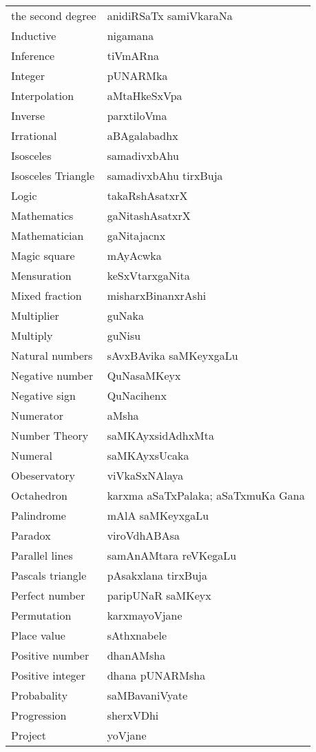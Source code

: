 {\begin{longtable}{>{\rm}l@{\hspace{1cm}}l}
the second degree &  anidiRSaTx samiVkaraNa\\
Inductive & nigamana\\
Inference & tiVmARna\\
Integer & pUNARMka\\
Interpolation & aMtaHkeSxVpa\\
Inverse & parxtiloVma\\
Irrational & aBAgalabadhx\\
Isosceles & samadivxbAhu\\
Isosceles Triangle & samadivxbAhu tirxBuja\\
Logic & takaRshAsatxrX\\
Mathematics & gaNitashAsatxrX\\
Mathematician & gaNitajacnx\\
Magic square & mAyAcwka\\
Mensuration & keSxVtarxgaNita\\
Mixed fraction & misharxBinanxrAshi\\
Multiplier & guNaka\\
Multiply & guNisu\\
Natural numbers & sAvxBAvika saMKeyxgaLu\\
Negative number & QuNasaMKeyx\\
Negative sign & QuNacihenx\\
Numerator & aMsha\\
Number Theory & saMKAyxsidAdhxMta\\
Numeral & saMKAyxsUcaka\\
Obeservatory & viVkaSxNAlaya\\
Octahedron & karxma aSaTxPalaka; aSaTxmuKa Gana\\
Palindrome & mAlA saMKeyxgaLu\\
Paradox & viroVdhABAsa\\
Parallel lines & samAnAMtara reVKegaLu\\
Pascals triangle & pAsakxlana tirxBuja\\
Perfect number & paripUNaR saMKeyx\\
Permutation & karxmayoVjane\\
Place value & sAthxnabele\\
Positive number & dhanAMsha\\
Positive integer & dhana pUNARMsha\\
Probabality & saMBavaniVyate\\
Progression & sherxVDhi\\
Project & yoVjane\\

\end{longtable}}
